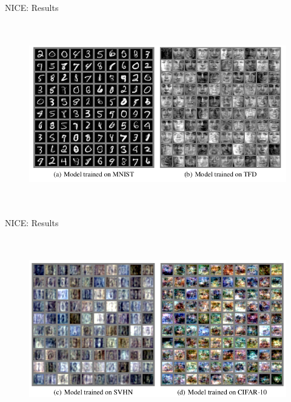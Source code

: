\begin{frame}{NICE: Results}
    \begin{figure}
        \centering
        \includegraphics[width=\textwidth, height = 8cm, keepaspectratio]{Images/nice_sampling_1.png}
        \label{fig:nice_sampling}
    \end{figure}
\end{frame}
\begin{frame}{NICE: Results}
    \begin{figure}
        \centering
        \includegraphics[width=\textwidth, height = 8cm, keepaspectratio]{Images/nice_sampling_2.png}
        \label{fig:nice_sampling2}
    \end{figure}
\end{frame}
